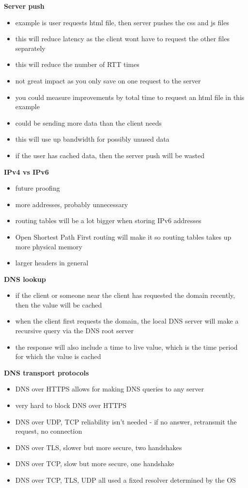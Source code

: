 \documentclass{article}
\begin{document}
\textbf{Server push}
\begin{itemize}
    \item example is user requests html file, then server pushes the css and js files
    \item this will reduce latency as the client wont have to request the other files separately
    \item this will reduce the number of RTT times
    \item not great impact as you only save on one request to the server
    \item you could measure improvements by total time to request an html file in this example
    \item could be sending more data than the client needs
    \item this will use up bandwidth for possibly unused data
    \item if the user has cached data, then the server push will be wasted
\end{itemize}


\textbf{IPv4 vs IPv6}
\begin{itemize}
    \item future proofing
    \item more addresses, probably unnecessary
    \item routing tables will be a lot bigger when storing IPv6 addresses
    \item Open Shortest Path First routing will make it so routing tables takes up more physical memory
    \item larger headers in general
\end{itemize}


\textbf{DNS lookup}
\begin{itemize}
    \item if the client or someone near the client has requested the domain recently, then the value will be cached
    \item when the client first requests the domain, the local DNS server will make a recursive query via the DNS root server
    \item the response will also include a time to live value, which is the time period for which the value is cached
\end{itemize}


\textbf{DNS transport protocols}
\begin{itemize}
    \item DNS over HTTPS allows for making DNS queries to any server
    \item very hard to block DNS over HTTPS
    \item DNS over UDP, TCP reliability isn't needed {-} if no answer, retransmit the request, no connection
    \item DNS over TLS, slower but more secure, two handshakes
    \item DNS over TCP, slow but more secure, one handshake
    \item DNS over TCP, TLS, UDP all used a fixed resolver determined by the OS
\end{itemize}
\end{document}
